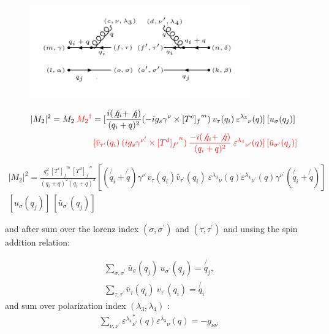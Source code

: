 \begin{figure}[h!]
\centering
\includegraphics[width=0.85\textwidth]{images/qbargqMSquer.png}
\end{figure}

\begin{equation}
\begin{split}
|M_2|^2=M_2\:{\color[RGB]{255,0,0} {M_2}^{\dagger}} = [\frac{i(\not{q_i} + \not{q})}{(q_i + q)^2} (-ig_s \gamma^{\nu}\times {[T^c]_f}^m) \:{v}_{\tau}(q_i)\: {\varepsilon^{\lambda_3}}_{\nu} (q)]\: [{u}_{\sigma}(q_j)]\: \\
\quad\quad\quad\quad\quad\quad\quad\quad\:\:{\color[RGB]{255,0,0}[\bar{v}_{{\tau}^{\prime}}(q_i) \: (ig_s \gamma^{{\nu}^{\prime}}\times {[T^d]_{f^{\prime}}}^n) \: \frac{-i(\not{q_i} + \not{q})}{(q_i + q)^2} \: {\varepsilon^{\lambda_4}}_{{\nu}^{\prime}} (q)]\: [\bar{u}_{{\sigma}^{\prime}}(q_j)]}
\end{split}
\end{equation}


\begin{equation}
\begin{split}
|M_2|^2 =\frac{g_s^2 \: {[T^c]_f}^m \: {[T^d]_{f^{\prime}}}^n }{(q_i + q)^2 (q_i + q)^2} [(\not{q_i} + \not{q}) \gamma^{\nu}  \:{v}_{\tau}(q_i)\bar{v}_{{\tau}^{\prime}}(q_i)\: {\varepsilon^{\lambda_3}}_{\nu} (q){\varepsilon^{\lambda_4}}_{{\nu}^{\prime}}  (q) \gamma^{{\nu}^{\prime}}(\not{q_i} + \not{q})]\: \\
[{u}_{\sigma}(q_j) ]
\: [\bar{u}_{{\sigma}^{\prime}}(q_j)]
\end{split}
\end{equation}

and after sum over the lorenz index $({\sigma},{\sigma}^{\prime})$ and $({\tau},{\tau}^{\prime})$ and unsing the spin addition relation:
 
\begin{equation}
\begin{split}
\displaystyle\sum\limits_{{\sigma},{\sigma}^{\prime}} {\bar{u}}_{\sigma}(q_j)\:u_{{\sigma}^{\prime}}(q_j) = \not{q_j},\\
\displaystyle\sum\limits_{{\tau},{\tau}^{\prime}} {\bar{v}}_{\tau}(q_i)\:v_{{\tau}^{\prime}}(q_i) = \not{q_i}
\end{split}
\end{equation}
and sum over polarization index $({\lambda_{3}},{\lambda}_{4})$ :
\begin{equation}
\begin{split}
 \displaystyle\sum\limits_{{\nu},{\nu}^{\prime}} {{\varepsilon^{\lambda_4}}_{{\nu}^{\prime}}^* (q) {\varepsilon^{\lambda_3}}_{\nu} (q)} = -g_{{\nu}{\nu}^{\prime}}
\end{split}
\end{equation}

